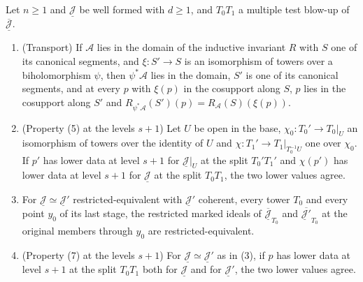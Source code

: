 \begin{lemma}
\label{bcalc:member-restrict-restrict-repr}
\leanok
Let \(n\ge1\) and \(\underline{\mathcal J}\) be well formed with \(d\ge1\), and \(T_0T_1\) a multiple test blow-up of \(\overline{\underline{\mathcal J}}\).
\begin{enumerate}
\item (Transport) If \(\mathcal A\) lies in the domain of the inductive invariant \(R\) with \(S\) one of its canonical segments, and \(\xi\colon S'\to S\) is an isomorphism of
towers over a biholomorphism \(\psi\), then \(\psi^*\mathcal A\) lies in the domain, \(S'\) is one of its canonical segments, and at every \(p\) with \(\xi(p)\) in the
cosupport along \(S\), \(p\) lies in the cosupport along \(S'\) and \(R_{\psi^*\mathcal A}(S')(p)=R_{\mathcal A}(S)(\xi(p))\).
\item (Property (5) at the levels \(s+1\)) Let \(U\) be open in the base, \(\chi_0\colon T_0'\to T_0|_U\) an isomorphism of towers over the identity of \(U\) and
\(\chi\colon T_1'\to T_1|_{T_0^{-1}U}\) one over \(\chi_0\). If \(p'\) has lower data at level \(s+1\) for \(\underline{\mathcal J}|_U\) at the split \(T_0'T_1'\) and \(\chi(p')\)
has lower data at level \(s+1\) for \(\underline{\mathcal J}\) at the split \(T_0T_1\), the two lower values agree.
\item For \(\underline{\mathcal J}\simeq\underline{\mathcal J}'\) restricted-equivalent with \(\underline{\mathcal J}'\) coherent, every tower \(T_0\) and every point \(y_0\) of
its last stage, the restricted marked ideals of \(\overline{\underline{\mathcal J}}_{T_0}\) and \(\overline{\underline{\mathcal J}'}_{T_0}\) at the original members through
\(y_0\) are restricted-equivalent.
\item (Property (7) at the levels \(s+1\)) For \(\underline{\mathcal J}\simeq\underline{\mathcal J}'\) as in (3), if \(p\) has lower data at level \(s+1\) at the split
\(T_0T_1\) both for \(\underline{\mathcal J}\) and for \(\underline{\mathcal J}'\), the two lower values agree.
\end{enumerate}
\end{lemma}
